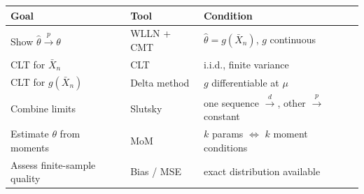 \begin{remark}
	\begin{center}
		\begin{tabular}{lll}
			\hline
			\textbf{Goal} & \textbf{Tool} & \textbf{Condition} \\
			\hline
			Show $\hat\theta\xrightarrow{p}\theta$ & WLLN + CMT & $\hat\theta=g(\bar X_n)$, $g$ continuous \\
			CLT for $\bar X_n$ & CLT & i.i.d., finite variance \\
			CLT for $g(\bar X_n)$ & Delta method & $g$ differentiable at $\mu$ \\
			Combine limits & Slutsky & one sequence $\xrightarrow{d}$, other $\xrightarrow{p}$ constant \\
			Estimate $\theta$ from moments & MoM & $k$ params $\Leftrightarrow$ $k$ moment conditions \\
			Assess finite-sample quality & Bias / MSE & exact distribution available \\
			\hline
		\end{tabular}
	\end{center}
\end{remark}

\newpage
